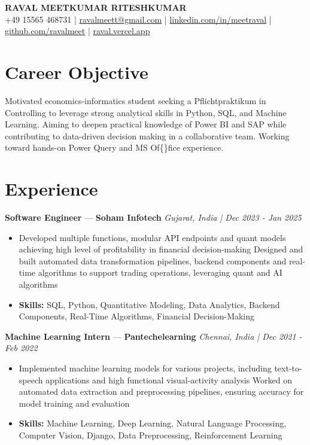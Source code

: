 \documentclass[a4paper,10pt]{article}
\begin{document}
\begin{center}
  {\Large\bfseries RAVAL MEETKUMAR RITESHKUMAR}\\[2pt]
  {\small +49 15565 468731 \;|\; \href{mailto:ravalmeett@gmail.com}{ravalmeett@gmail.com} \;|\; \href{https://www.linkedin.com/in/meetraval/}{linkedin.com/in/meetraval} \;|\; \href{https://github.com/ravalmeet}{github.com/ravalmeet} \;|\; \href{https://raval.vercel.app/}{raval.vercel.app}}
\end{center}
\vspace{-3pt}

\section*{Career Objective}
Motivated economics-informatics student seeking a Pflichtpraktikum in Controlling to leverage strong analytical skills in Python, SQL, and Machine Learning. Aiming to deepen practical knowledge of Power BI and SAP while contributing to data-driven decision making in a collaborative team. Working toward hands-on Power Query and MS Of\{\}fice experience.\par

\section*{Experience}
\textbf{Software Engineer} — \textbf{Soham Infotech} \hfill \textit{Gujarat, India \;|\; Dec 2023 - Jan 2025}\par
\vspace{1pt}
\begin{itemize}
  \item Developed multiple functions, modular API endpoints and quant models achieving high level of profitability in financial decision-making Designed and built automated data transformation pipelines, backend components and real-time algorithms to support trading operations, leveraging quant and AI algorithms
  \item \textbf{Skills:} SQL, Python, Quantitative Modeling, Data Analytics, Backend Components, Real-Time Algorithms, Financial Decision-Making
\end{itemize}
\vspace{3pt}
\textbf{Machine Learning Intern} — \textbf{Pantechelearning} \hfill \textit{Chennai, India \;|\; Dec 2021 - Feb 2022}\par
\vspace{1pt}
\begin{itemize}
  \item Implemented machine learning models for various projects, including text-to-speech applications and high functional visual-activity analysis Worked on automated data extraction and preprocessing pipelines, ensuring accuracy for model training and evaluation
  \item \textbf{Skills:} Machine Learning, Deep Learning, Natural Language Processing, Computer Vision, Django, Data Preprocessing, Reinforcement Learning
\end{itemize}
\end{document}
